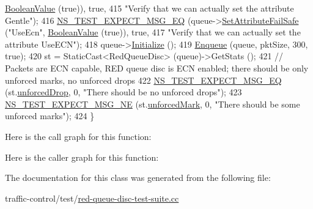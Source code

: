 \begin{DoxyCode}
      \hyperlink{classns3_1_1BooleanValue}{BooleanValue} (\textcolor{keyword}{true})), \textcolor{keyword}{true},
415                          \textcolor{stringliteral}{"Verify that we can actually set the attribute Gentle"});
416   \hyperlink{group__testing_ga7304ba46a28d8cf08dfdfd6499cf7068}{NS\_TEST\_EXPECT\_MSG\_EQ} (queue->\hyperlink{classns3_1_1ObjectBase_aa7d333004e970f925a4ed5df275541b5}{SetAttributeFailSafe} (\textcolor{stringliteral}{"UseEcn"}, 
      \hyperlink{classns3_1_1BooleanValue}{BooleanValue} (\textcolor{keyword}{true})), \textcolor{keyword}{true},
417                          \textcolor{stringliteral}{"Verify that we can actually set the attribute UseECN"});
418   queue->\hyperlink{classns3_1_1Object_af4411cb29971772fcd09203474a95078}{Initialize} ();
419   \hyperlink{classRedQueueDiscTestCase_a231b433374e4485d83bcca3088685e31}{Enqueue} (queue, pktSize, 300, \textcolor{keyword}{true});
420   st = StaticCast<RedQueueDisc> (queue)->GetStats ();
421   \textcolor{comment}{// Packets are ECN capable, RED queue disc is ECN enabled; there should be only unforced marks, no
       unforced drops}
422   \hyperlink{group__testing_ga7304ba46a28d8cf08dfdfd6499cf7068}{NS\_TEST\_EXPECT\_MSG\_EQ} (st.\hyperlink{structns3_1_1RedQueueDisc_1_1Stats_a242027f6eb7d30e2cd636c52080e2c73}{unforcedDrop}, 0, \textcolor{stringliteral}{"There should be no unforced
       drops"});
423   \hyperlink{group__testing_ga6d4b162d26b8a930115b97dd5f3d9ed9}{NS\_TEST\_EXPECT\_MSG\_NE} (st.\hyperlink{structns3_1_1RedQueueDisc_1_1Stats_aa974fb3ee97c612e0a6d77259a3672df}{unforcedMark}, 0, \textcolor{stringliteral}{"There should be some
       unforced marks"});
424 \}
\end{DoxyCode}


Here is the call graph for this function\+:




Here is the caller graph for this function\+:




The documentation for this class was generated from the following file\+:\begin{DoxyCompactItemize}
\item 
traffic-\/control/test/\hyperlink{red-queue-disc-test-suite_8cc}{red-\/queue-\/disc-\/test-\/suite.\+cc}\end{DoxyCompactItemize}
